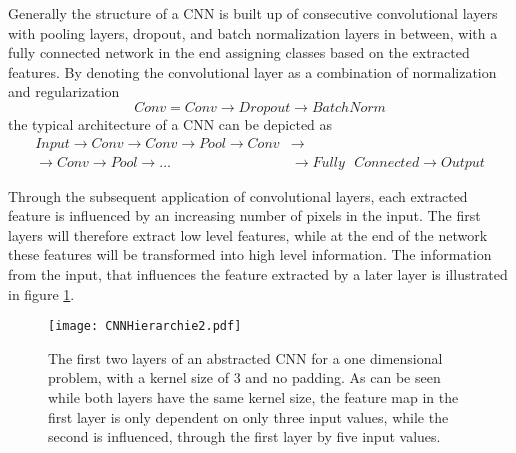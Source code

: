 Generally the structure of a CNN is built up of consecutive convolutional layers with pooling layers, dropout, and batch normalization layers in between, with a fully connected network in the end assigning classes based on the extracted features. By denoting the convolutional layer as a combination of normalization and regularization
\begin{equation}
Conv = Conv \rightarrow Dropout \rightarrow BatchNorm
\end{equation}
the typical architecture of a CNN can be depicted as
\begin{equation*}
\begin{split}
Input \rightarrow
Conv \rightarrow {Conv} \rightarrow {Pool} \rightarrow {Conv} & \rightarrow \\
 \rightarrow {Conv} \rightarrow {Pool} \rightarrow \dots & \rightarrow {Fully \text{ } Connected} \rightarrow Output
\end{split}
\end{equation*}

Through the subsequent application of convolutional layers, each extracted feature is influenced by an increasing number of pixels in the input. The first layers will therefore extract low level features, while at the end of the network these features will be transformed into high level information. The information from the input, that influences the feature extracted by a later layer is illustrated in figure \ref{fig:featureHierarchy}. 

\begin{figure}[H]
\centering
\texttt{[image: CNNHierarchie2.pdf]}
\caption{The first two layers of an abstracted CNN for a one dimensional problem, with a kernel size of $3$ and no padding. As can be seen while both layers have the same kernel size, the feature map in the first layer is only dependent on only three input values, while the second is influenced, through the first layer by five input values.}
\label{fig:featureHierarchy}
\end{figure}

